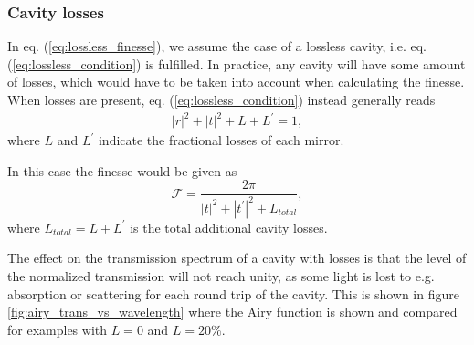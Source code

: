 \subsubsection{Cavity losses}\label{sec:cavity_losses}

In eq. (\ref{eq:lossless_finesse}), we assume the case of a lossless cavity, i.e. eq. (\ref{eq:lossless_condition}) is fulfilled. In practice, any cavity will have some amount of losses, which would have to be taken into account when calculating the finesse. When losses are present, eq. (\ref{eq:lossless_condition}) instead generally reads
\begin{eqnarray}
    |r|^2 + |t|^2 + L + L^{\prime} = 1,
\end{eqnarray}
where $L$ and $L^{\prime}$ indicate the fractional losses of each mirror.

In this case the finesse would be given as 
\begin{equation}
    \mathcal{F} = \frac{2 \pi}{|t|^2 + |t^{\prime}|^2 + L_{total}},
\end{equation}
where $L_{total} = L + L^{\prime}$ is the total additional cavity losses.

The effect on the transmission spectrum of a cavity with losses is that the level of the normalized transmission will not reach unity, as some light is lost to e.g. absorption or scattering for each round trip of the cavity. This is shown in figure \ref{fig:airy_trans_vs_wavelength} where the Airy function is shown and compared for examples with $L=0$ and $L=20\%$.
